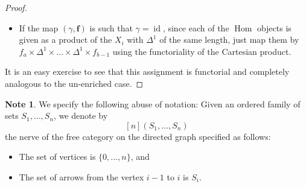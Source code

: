 \documentclass[a4paper]{article}
\numberwithin{equation}{subsection}
\theoremstyle{plain}   %
\theoremstyle{definition}
\newtheorem{note}[equation]{Note}
\theoremstyle{remark}
\theoremstyle{plain}
\DeclareMathOperator{\id}{id}
\DeclareMathOperator{\Hom}{Hom}
\begin{document}
\begin{proof}
\begin{itemize}
		\item If the map \((\gamma,\mathbf{f})\) is such that \(\gamma=\id\), since each of the \(\Hom\) objects is given as 	a product of the \(X_i\) with \(\Delta^1\) of the same length, just map them by \(f_a\times\Delta^1\times \dots 	\times\Delta^1 \times f_{b-1}\) using the functoriality of the Cartesian product.
	\end{itemize}
	It is an easy exercise to see that this assignment is functorial and completely analogous to the un-enriched case.
\end{proof}


\begin{note}
	We specify the following abuse of notation: Given an ordered family of sets \(S_1,\dots, S_n\), we denote by
	\[
		[n](S_1,\dots,S_n)
	\]
	the nerve of the free category on the directed graph specified as follows:
	\begin{itemize}
		\item The set of vertices is \(\{0,\dots,n\}\), and
		\item The set of arrows from the vertex \(i-1\) to \(i\) is \(S_i\).
	\end{itemize}
\end{note}
\end{document}
